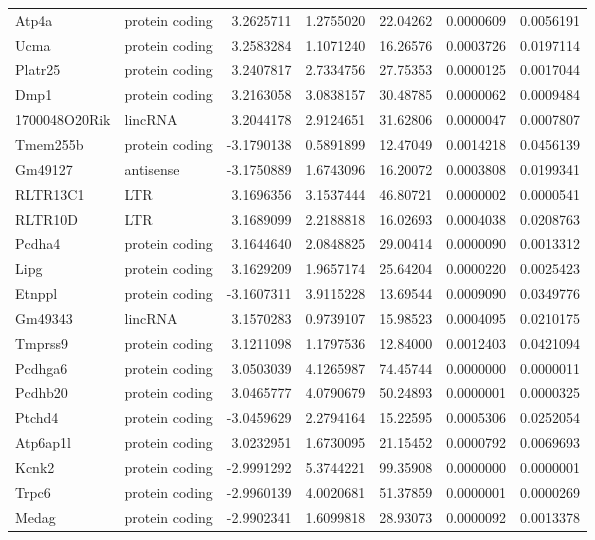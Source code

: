 \documentclass[onehalf,12pt]{beavtex}
\begin{document}
\begin{longtable}{llrrrrr}
  \addlinespace
  Atp4a & protein coding & 3.2625711 & 1.2755020 & 22.04262 & 0.0000609 & 0.0056191\\
  Ucma & protein coding & 3.2583284 & 1.1071240 & 16.26576 & 0.0003726 & 0.0197114\\
  Platr25 & protein coding & 3.2407817 & 2.7334756 & 27.75353 & 0.0000125 & 0.0017044\\
  Dmp1 & protein coding & 3.2163058 & 3.0838157 & 30.48785 & 0.0000062 & 0.0009484\\
  1700048O20Rik & lincRNA & 3.2044178 & 2.9124651 & 31.62806 & 0.0000047 & 0.0007807\\
  \addlinespace
  Tmem255b & protein coding & -3.1790138 & 0.5891899 & 12.47049 & 0.0014218 & 0.0456139\\
  Gm49127 & antisense & -3.1750889 & 1.6743096 & 16.20072 & 0.0003808 & 0.0199341\\
  RLTR13C1 & LTR & 3.1696356 & 3.1537444 & 46.80721 & 0.0000002 & 0.0000541\\
  RLTR10D & LTR & 3.1689099 & 2.2188818 & 16.02693 & 0.0004038 & 0.0208763\\
  Pcdha4 & protein coding & 3.1644640 & 2.0848825 & 29.00414 & 0.0000090 & 0.0013312\\
  \addlinespace
  Lipg & protein coding & 3.1629209 & 1.9657174 & 25.64204 & 0.0000220 & 0.0025423\\
  Etnppl & protein coding & -3.1607311 & 3.9115228 & 13.69544 & 0.0009090 & 0.0349776\\
  Gm49343 & lincRNA & 3.1570283 & 0.9739107 & 15.98523 & 0.0004095 & 0.0210175\\
  Tmprss9 & protein coding & 3.1211098 & 1.1797536 & 12.84000 & 0.0012403 & 0.0421094\\
  Pcdhga6 & protein coding & 3.0503039 & 4.1265987 & 74.45744 & 0.0000000 & 0.0000011\\
  \addlinespace
  Pcdhb20 & protein coding & 3.0465777 & 4.0790679 & 50.24893 & 0.0000001 & 0.0000325\\
  Ptchd4 & protein coding & -3.0459629 & 2.2794164 & 15.22595 & 0.0005306 & 0.0252054\\
  Atp6ap1l & protein coding & 3.0232951 & 1.6730095 & 21.15452 & 0.0000792 & 0.0069693\\
  Kcnk2 & protein coding & -2.9991292 & 5.3744221 & 99.35908 & 0.0000000 & 0.0000001\\
  Trpc6 & protein coding & -2.9960139 & 4.0020681 & 51.37859 & 0.0000001 & 0.0000269\\
  \addlinespace
  Medag & protein coding & -2.9902341 & 1.6099818 & 28.93073 & 0.0000092 & 0.0013378\\

\end{longtable}
\end{document}

